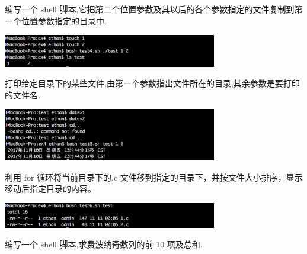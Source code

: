 \documentclass{JNUexp}
\begin{document}
\begin{problem}
编写一个 shell 脚本,它把第二个位置参数及其以后的各个参数指定的文件复制到第一个位置参数指定的目录中.
\end{problem}

\begin{answer}
    
\end{answer}

\begin{image}
    \includegraphics[width=0.7\textwidth]{3}
\end{image}

\begin{problem}
    打印给定目录下的某些文件,由第一个参数指出文件所在的目录,其余参数是要打印的文件名.
\end{problem}

\begin{answer}
    
\end{answer}

\begin{image}
    \includegraphics[width=0.7\textwidth]{4}
\end{image}

\begin{problem}
    利用 for 循环将当前目录下的.c 文件移到指定的目录下，并按文件大小排序，显示移动后指定目录的内容。
\end{problem}

\begin{answer}
    
\end{answer}

\begin{image}
    \includegraphics[width=0.7\textwidth]{5}
\end{image}
\begin{problem}
    编写一个 shell 脚本,求费波纳奇数列的前 10 项及总和.
\end{problem}
\end{document}
